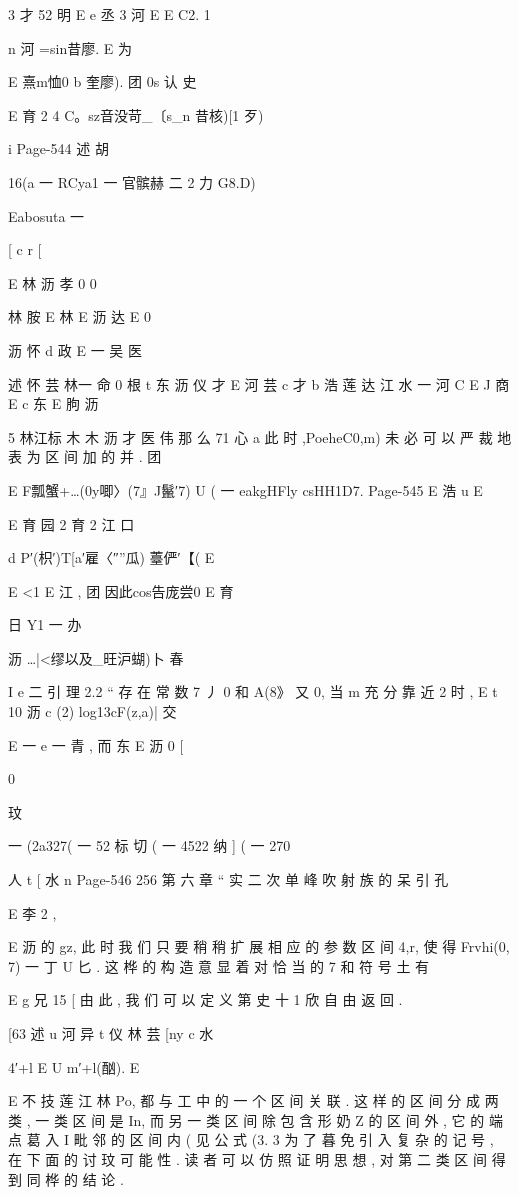 {{3 才 52 明
E
e 丞 3 河
E
E C2. 1

n 河 =sin昔廖. E
为

E 熹m恤0 b 奎廖).
团
0s 认 史

E 育 2
4 C。sz音没苛_〔s_n 昔核)[1 歹)

i
Page-544
述 胡

16(a 一 RCya1 一 官髌赫 二 2 力 G8.D)

Eabosuta 一

[
c r [

E 林 沥 孝 0
0

林 胺
E 林
E 沥 达
E
0

沥 怀 d 政
E 一 吴
医

述 怀 芸 林一 命
0 根 t 东 沥 仪 才
E 河 芸 c 才 b 浩 莲 达 江 水 一 河
C
E J 商
E
c 东
E 朐 沥

5 林江标 木 木 沥 才 医 伟
那 么 71 心 a 此 时 ,PoeheC0,m) 未 必 可 以 严 裁 地 表 为 区 间 加 的 并 .
团

E F瓢蟹+…(0y唧〉\〈(7』J鬣′7) U ( 一 eakgHFly csHH1D7.
Page-545
E 浩 u E

E 育
园 2 育 2 江 口

d P′(枳′)T[a′雇〈″”瓜) 薹俨′【(%
E

E <1 E 江 ,
团 因此cos告庞尝0 E 育

日
Y1 一 办

沥 …|<缪以及_旺沪蝴)卜 春

I
e 二
引 理 2.2 “ 存 在 常 数 7 丿 0 和 A(8》 又 0, 当 m 充 分 靠 近 2 时 ,
E
t
10 沥 c
(2) log13cF(z,a)| 交

E 一 e 一 青 , 而 东
E 沥
0
[

0

玟

一 (2a327( 一 52 标 切 ( 一 4522 纳 ] ( 一 270

人
t
[ 水
n
Page-546
256 第 六 章 “ 实 二 次 单 峰 吹 射 族 的 呆 引 孔

E 李 2 ,

E 沥
的 gz, 此 时 我 们 只 要 稍 稍 扩 展 相 应 的 参 数 区 间 4,r, 使 得 Frvhi(0,
7) 一 丁 U 匕 . 这 桦 的 构 造 意 显 着 对 恰 当 的 7 和 符 号 土 有

E g 兄 15 [
由 此 , 我 们 可 以 定 义 第 史 十 1 欣 自 由 返 回 .

[63 述 u 河 异 t
仪
林 芸
[ny c 水

4′+l E U m′+l(酗).
E

E 不 技 莲 江 林
Po, 都 与 工 中 的 一 个 区 间 关 联 . 这 样 的 区 间 分 成 两 类 , 一 类 区 间 是
In, 而 另 一 类 区 间 除 包 含 形 奶 Z 的 区 间 外 , 它 的 端 点 葛 入 I 毗 邻
的 区 间 内 ( 见 公 式 (3. 3 为 了 暮 免 引 入 复 杂 的 记 号 , 在 下 面 的 讨
玟
可 能 性 . 读 者 可 以 仿 照 证 明 思 想 , 对 第 二 类 区 间 得 到 同 桦 的 结 论 .

}}
